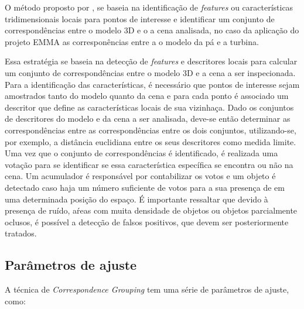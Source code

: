 O método proposto por \cite{Tombari2010a}, se baseia na identificação de
\textit{features} ou características tridimensionais locais para pontos de
interesse e identificar um conjunto de correspondências entre o modelo 3D e o a
cena analisada, no caso da aplicação do projeto EMMA as corresponências entre a
o modelo da pá e a turbina.

Essa estratégia se baseia na detecção de \textit{features} e descritores locais
para calcular um conjunto de correspondências entre o modelo 3D e a cena a ser
inspecionada. Para a identificação das características, é necessário que
pontos de interesse sejam amostrados tanto do modelo quanto da cena e para cada
ponto é associado um descritor que define as características locais de sua
vizinhaça. Dado os conjuntos de descritores do modelo e da cena a ser analisada,
deve-se então determinar as correspondências entre as correspondências entre os
dois conjuntos, utilizando-se, por exemplo, a distância euclidiana entre os seus
descritores como medida limite. Uma vez que o conjunto de correspondências é
identificado, é realizada uma votação para se identificar se essa característica específica se
encontra ou não na cena. Um acumulador é responsável por contabilizar os votos e
um objeto é detectado caso haja um número suficiente de votos para a sua
presença de em uma determinada posição do espaço. É importante ressaltar que
devido à presença de ruído, aŕeas com muita densidade de objetos ou objetos
parcialmente oclusos, é possível a detecção de falsos positivos, que devem ser
posteriormente tratados.

\subsection{Parâmetros de ajuste}

A técnica de \textit{Correspondence Grouping} tem uma série de parâmetros de
ajuste, como: 

